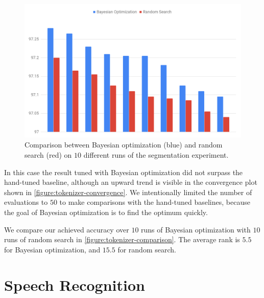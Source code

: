 \begin{figure}
	\begin{center}
		\includegraphics[width=1.0\textwidth]{images/tokenizer-comparison.png}
		\caption{Comparison between Bayesian optimization (blue) and random search (red) on $10$ different runs of the segmentation experiment.}
		\label{figure:tokenizer-comparison}
	\end{center}
\end{figure}

In this case the result tuned with Bayesian optimization did not surpass the hand-tuned baseline, although an upward trend is visible in the convergence plot shown in \autoref{figure:tokenizer-convergence}. We intentionally limited the number of evaluations to $50$ to make comparisons with the hand-tuned baselines, because the goal of Bayesian optimization is to find the optimum quickly.

We compare our achieved accuracy over $10$ runs of Bayesian optimization with $10$ runs of random search in \autoref{figure:tokenizer-comparison}. The average rank is $5.5$ for Bayesian optimization, and $15.5$ for random search.

\section{Speech Recognition}

